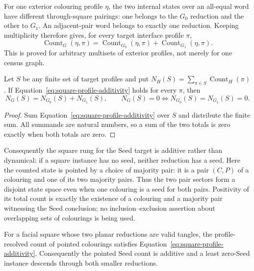 For one exterior colouring profile \(\eta\), the two internal states over an
all-equal word have different through-square pairings: one belongs to the
\(G_0\) reduction and the other to \(G_1\).  An adjacent-pair word belongs to
exactly one reduction.  Keeping multiplicity therefore gives, for every
target interface profile \(\pi\),
\begin{equation}
  \operatorname{Count}_{G}(\eta,\pi)
  =\operatorname{Count}_{G_0}(\eta,\pi)
   +\operatorname{Count}_{G_1}(\eta,\pi).
  \label{eq:square-profile-additivity}
\end{equation}
This is proved for arbitrary multisets of exterior profiles, not merely for
one census graph.

\begin{lemma}
\label{lem:square-zero-descends}
\Sprose
Let \(S\) be any finite set of target profiles and put
\(N_H(S)=\sum_{\pi\in S}\operatorname{Count}_H(\pi)\).  If
Equation~\eqref{eq:square-profile-additivity} holds for every \(\pi\), then
\[
     N_G(S)=N_{G_0}(S)+N_{G_1}(S),
     \qquad
     N_G(S)=0\Longleftrightarrow
     N_{G_0}(S)=N_{G_1}(S)=0.
\]
\end{lemma}

\begin{proof}
Sum Equation~\eqref{eq:square-profile-additivity} over \(S\) and distribute
the finite sum.  All summands are natural numbers, so a sum of the two
totals is zero exactly when both totals are zero.
\end{proof}

Consequently the square rung for the Seed target is additive rather than
dynamical: if a square instance has no seed, neither reduction has a seed.
Here the counted state is pointed by a choice of majority pair: it is a pair
\((C,P)\) of a colouring and one of its two majority pairs.  Thus the two
pair sectors form a disjoint state space even when one colouring is a seed
for both pairs.  Positivity of its total count is exactly the existence of a
colouring and a majority pair witnessing the Seed conclusion; no
inclusion--exclusion assertion about overlapping sets of colourings is being
used.

\begin{theorem}
\label{prop:graph-square-count-transport}
\Sprose
For a facial square whose two planar reductions are valid tangles, the
profile-resolved count of pointed colourings satisfies
Equation~\eqref{eq:square-profile-additivity}.  Consequently the pointed Seed
count is additive and a least zero-Seed instance descends through both
smaller reductions.
\end{theorem}

